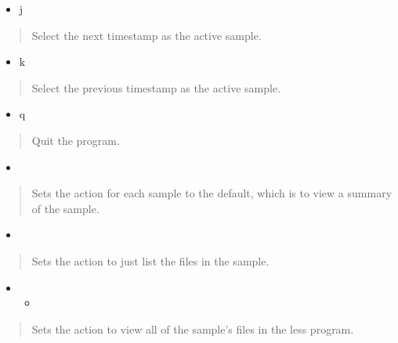 \documentclass[letterpaper,10pt,english]{sphinxmanual}
\begin{document}
\begin{itemize}
\item {} 
\sphinxAtStartPar
j

\end{itemize}
\begin{quote}

\sphinxAtStartPar
Select the next timestamp as the active sample.
\end{quote}
\begin{itemize}
\item {} 
\sphinxAtStartPar
k

\end{itemize}
\begin{quote}

\sphinxAtStartPar
Select the previous timestamp as the active sample.
\end{quote}
\begin{itemize}
\item {} 
\sphinxAtStartPar
q

\end{itemize}
\begin{quote}

\sphinxAtStartPar
Quit the program.
\end{quote}
\begin{itemize}
\item {} 

\end{itemize}
\begin{quote}

\sphinxAtStartPar
Sets the action for each sample to the default, which is to view a summary
of the sample.
\end{quote}
\begin{itemize}
\item {} 

\end{itemize}
\begin{quote}

\sphinxAtStartPar
Sets the action to just list the files in the sample.
\end{quote}
\begin{itemize}
\item {} \begin{itemize}
\item {} 
\end{itemize}

\end{itemize}
\begin{quote}

\sphinxAtStartPar
Sets the action to view all of the sample’s files in the less program.
\end{quote}
\end{document}
